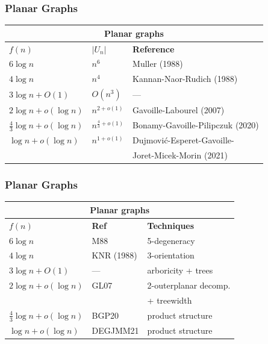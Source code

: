 \documentclass[xcolor=dvipsnames]{beamer}
\begin{document}
\begin{frame}
    \frametitle{Planar Graphs}
    \begin{center}
        \begin{tabular}{@{}lll@{}} \hline
            \multicolumn{3}{|c|}{\textbf{Planar graphs}} \\ \hline
            \boldmath $f(n)$ & \boldmath$|U_n|$ & \textbf{Reference} \\ \hline %
            {$6\log n$} & $n^6$ & Muller (1988) \\ %
            {$4\log n$} & $n^4$ & Kannan-Naor-Rudich (1988) \\ %
            {$3\log n + O(1)$} & $O(n^3)$ & ---  \\ %
            {$2\log n + o(\log n)$} & $n^{2+o(1)}$ & Gavoille-Labourel (2007) \\ %
            {$\tfrac{4}{3}\log n + o(\log n)$} & $n^{\tfrac{4}{3}+o(1)}$ & Bonamy-Gavoille-Pilipczuk (2020) \\ %
            {$\log n + o(\log n)$} & $n^{1+o(1)}$ & Dujmović-Esperet-Gavoille-\\ & & Joret-Micek-Morin (2021) %
        \end{tabular}
    \end{center}
\end{frame}

\begin{frame}
    \frametitle{Planar Graphs}
    \begin{center}
        \begin{tabular}{lll} \hline
          \multicolumn{3}{|c|}{\textbf{Planar graphs}} \\ \hline
            \boldmath$f(n)$ & \textbf{Ref} & \textbf{Techniques} \\ \hline
            {$6\log n$} & M88 & 5-degeneracy \\
            {$4\log n$} & KNR (1988) & 3-orientation \\
            {$3\log n + O(1)$} & --- & arboricity + trees \\
            {$2\log n + o(\log n)$} & GL07 & 2-outerplanar decomp. \\
            & & + treewidth \\
            {$\tfrac{4}{3}\log n + o(\log n)$} & BGP20 & product structure  \\
            {$\log n + o(\log n)$} & DEGJMM21 & product structure  \\
        \end{tabular}
    \end{center}
\end{frame}
\end{document}
